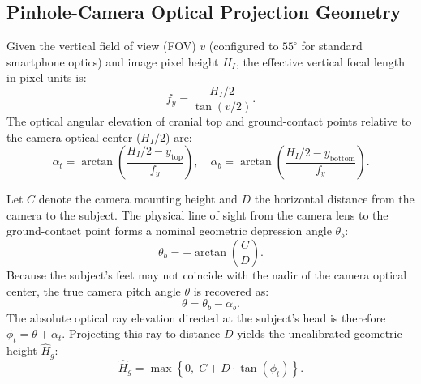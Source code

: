 \documentclass[conference]{IEEEtran}
\begin{document}
\subsection{Pinhole-Camera Optical Projection Geometry}
Given the vertical field of view (FOV) $v$ (configured to $55^\circ$ for standard smartphone optics) and image pixel height $H_I$, the effective vertical focal length in pixel units is:
\begin{equation}
f_y = \frac{H_I / 2}{\tan(v/2)}.
\label{eq:focal}
\end{equation}
The optical angular elevation of cranial top and ground-contact points relative to the camera optical center ($H_I/2$) are:
\begin{equation}
\alpha_t = \arctan \left( \frac{H_I / 2 - y_{\text{top}}}{f_y} \right), \quad
\alpha_b = \arctan \left( \frac{H_I / 2 - y_{\text{bottom}}}{f_y} \right).
\end{equation}

Let $C$ denote the camera mounting height and $D$ the horizontal distance from the camera to the subject. The physical line of sight from the camera lens to the ground-contact point forms a nominal geometric depression angle $\theta_b$:
\begin{equation}
\theta_b = -\arctan \left( \frac{C}{D} \right).
\end{equation}
Because the subject's feet may not coincide with the nadir of the camera optical center, the true camera pitch angle $\theta$ is recovered as:
\begin{equation}
\theta = \theta_b - \alpha_b.
\end{equation}
The absolute optical ray elevation directed at the subject's head is therefore $\phi_t = \theta + \alpha_t$. Projecting this ray to distance $D$ yields the uncalibrated geometric height $\widehat{H}_g$:
\begin{equation}
\widehat{H}_g = \max \left\{ 0, \; C + D \cdot \tan(\phi_t) \right\}.
\label{eq:height}
\end{equation}
\end{document}

